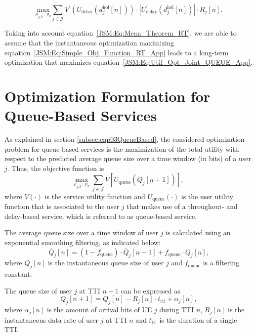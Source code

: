 \begin{apendicesenv}
\begin{equation}
\label{JSM:Eq:Simple_Obj_Function_RT_App}
\underset{\rho_{j,k},\;p_{k}}{\text{max}} \sum_{j \in \mathcal{J}}
V^{'}\left(U_{\mathrm{delay}}\left(d_j^{\mathrm{hol}}\left[n\right]\right)\right) \cdot
\left|U_{\mathrm{delay}}^{'}\left( d_{j}^\mathrm{hol}\left[n\right]\right)\right| \cdot
R_j\left[n\right].
\end{equation}

Taking into account equation~\eqref{JSM:Eq:Mean_Theorem_RT}, we are able to assume that the instantaneous optimization maximizing equation~\eqref{JSM:Eq:Simple_Obj_Function_RT_App} leads to a long-term optimization that maximizes equation~\eqref{JSM:Eq:Util_Opt_Joint_QUEUE_App}.

\chapter{Optimization Formulation for Queue-Based Services}
\label{Ap:QueueBasedOpt}

As explained in section \ref{subsec:cap03QueueBased}, the considered optimization problem for queue-based services is the maximization of the total utility with respect to the predicted average queue size over a time window (in bits) of a user $j$.
Thus, the objective function is 
%
\begin{equation}
\label{JSM:Eq:Util_Opt_Joint_RT_App}
\underset{\rho_{j,k},\;p_{k}}{\text{max}} \; \sum_{j \in \mathcal{J}} V\left[U_{\mathrm{queue}}\left(\overline{Q}_{j}\left[n+1\right]\right)\right],
\end{equation} 
%
where $V\left(\cdot\right)$ is the service utility function and $U_{\mathrm{queue}}\left(\cdot\right)$ is the user utility function that is associated to the user $j$ that makes use of a throughout- and delay-based service, which is referred to as queue-based service.

The average queue size over a time window of user $j$ is calculated using an exponential smoothing filtering, as indicated below: 
%
\begin{equation}
\label{JSM:Eq:Util_Avg_Queue_Calc}
\overline{Q}_{j}\left[n\right] = \left(1 - f_{\mathrm{queue}}\right) \cdot \overline{Q}_{j}\left[n-1\right] + f_{\mathrm{queue}} \cdot Q_{j}\left[n\right],
\end{equation} 
%
where $Q_{j}\left[n\right]$ is the instantaneous queue size of user $j$ and $f_{\mathrm{queue}}$ is a filtering constant.

The queue size of user $j$ at \ac{TTI} $n+1$ can be expressed as \cite{song2004joint} 
% 
\begin{equation}
\label{JSM:Eq:Util_Queue_Calc}
Q_{j}\left[n+1\right] = Q_{j}\left[n\right] - R_j\left[n\right] \cdot t_{\mathrm{tti}} + \alpha_j{\left[n\right]},
\end{equation} 
%
where $\alpha_j{\left[n\right]}$ is the amount of arrival bits of \ac{UE} $j$ during \ac{TTI} $n$, $R_j\left[n\right]$ is the instantaneous data rate of user $j$ at \ac{TTI} $n$ and $t_{\mathrm{tti}}$ is the duration of a single \ac{TTI}.


\end{apendicesenv}
